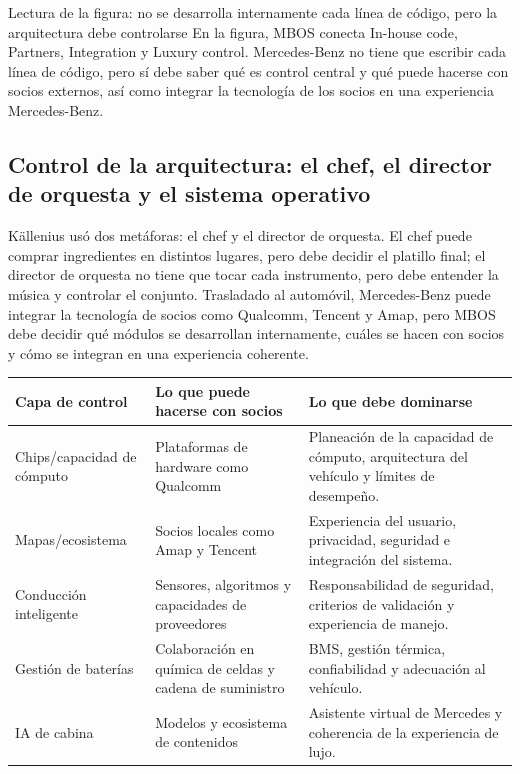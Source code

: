\documentclass[a4paper]{article}
\begin{document}
\begin{knowledgebox}{Lectura de la figura: no se desarrolla internamente cada línea de código, pero la arquitectura debe controlarse}
En la figura, MBOS conecta In-house code, Partners, Integration y Luxury control. Mercedes-Benz no tiene que escribir cada línea de código, pero sí debe saber qué es control central y qué puede hacerse con socios externos, así como integrar la tecnología de los socios en una experiencia Mercedes-Benz.
\end{knowledgebox}

\subsection{Control de la arquitectura: el chef, el director de orquesta y el sistema operativo}

Källenius usó dos metáforas: el chef y el director de orquesta. El chef puede comprar ingredientes en distintos lugares, pero debe decidir el platillo final; el director de orquesta no tiene que tocar cada instrumento, pero debe entender la música y controlar el conjunto. Trasladado al automóvil, Mercedes-Benz puede integrar la tecnología de socios como Qualcomm, Tencent y Amap, pero MBOS debe decidir qué módulos se desarrollan internamente, cuáles se hacen con socios y cómo se integran en una experiencia coherente.

\noindent\begin{tabularx}{\textwidth}{p{}p{}X}
\toprule
Capa de control & Lo que puede hacerse con socios & Lo que debe dominarse \\
\midrule
Chips/capacidad de cómputo & Plataformas de hardware como Qualcomm & Planeación de la capacidad de cómputo, arquitectura del vehículo y límites de desempeño. \\
Mapas/ecosistema & Socios locales como Amap y Tencent & Experiencia del usuario, privacidad, seguridad e integración del sistema. \\
Conducción inteligente & Sensores, algoritmos y capacidades de proveedores & Responsabilidad de seguridad, criterios de validación y experiencia de manejo. \\
Gestión de baterías & Colaboración en química de celdas y cadena de suministro & BMS, gestión térmica, confiabilidad y adecuación al vehículo. \\
IA de cabina & Modelos y ecosistema de contenidos & Asistente virtual de Mercedes y coherencia de la experiencia de lujo. \\
\bottomrule
\end{tabularx}
\end{document}

